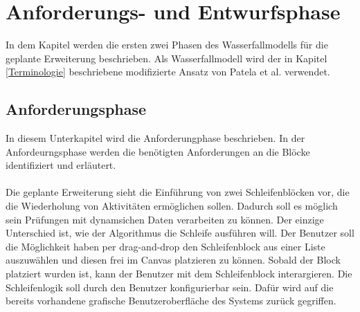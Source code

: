 \documentclass{article}
\begin{document}
    \newpage
    \section{Anforderungs- und Entwurfsphase}
    In dem Kapitel werden die ersten zwei Phasen des Wasserfallmodells für die geplante Erweiterung beschrieben. 
    Als Wasserfallmodell wird der in Kapitel \ref{Terminologie} beschriebene modifizierte Ansatz von Patela et al. verwendet.
    \subsection{Anforderungsphase}
    In diesem Unterkapitel wird die Anforderungphase beschrieben.
    In der Anfordeurngsphase werden die benötigten Anforderungen an die Blöcke identifiziert und erläutert. \cite{24}\\
    \\
    Die geplante Erweiterung sieht die Einführung von zwei Schleifenblöcken vor, die die Wiederholung von Aktivitäten ermöglichen sollen. 
    Dadurch soll es möglich sein Prüfungen mit dynamsichen Daten verarbeiten zu können.
    Der einzige Unterschied ist, wie der Algorithmus die Schleife ausführen will.
    Der Benutzer soll die Möglichkeit haben per drag-and-drop den Schleifenblock aus einer Liste auszuwählen und diesen frei im Canvas platzieren zu können.
    Sobald der Block platziert wurden ist, kann der Benutzer mit dem Schleifenblock interargieren.
    Die Schleifenlogik soll durch den Benutzer konfigurierbar sein. 
    Dafür wird auf die bereits vorhandene grafische Benutzeroberfläche des Systems zurück gegriffen.
\end{document}
